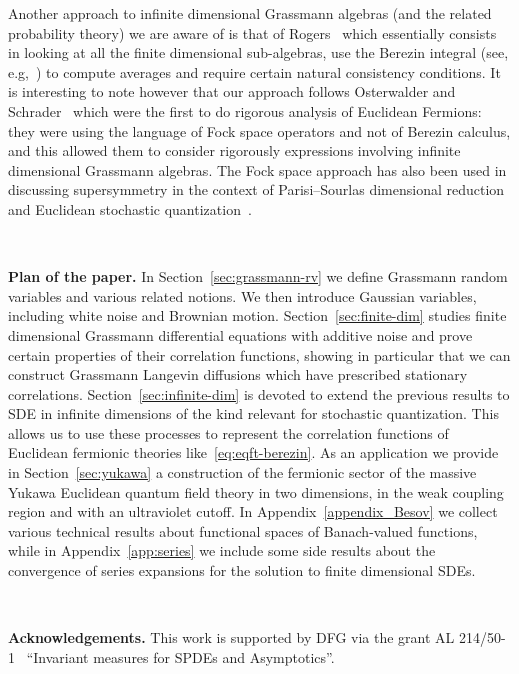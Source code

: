 \documentclass{article}
\newcommand{\tmtextbf}[1]{{\bfseries{#1}}}
\begin{document}
Another approach to infinite dimensional Grassmann algebras (and the related
probability theory) we are aware of is that of
Rogers~{\cite{rogers_graded_1986}} which essentially consists in looking at
all the finite dimensional sub-algebras, use the Berezin integral (see,
e.g,~{\cite{kirillov_introduction_1987}}) to compute averages and require
certain natural consistency conditions. It is interesting to note however that
our approach follows Osterwalder and
Schrader~{\cite{osterwalder_euclidean_1973,osterwalder_euclidean_1973-2}}
which were the first to do rigorous analysis of Euclidean Fermions: they were
using the language of Fock space operators and not of Berezin calculus, and
this allowed them to consider rigorously expressions involving infinite
dimensional Grassmann algebras. The Fock space approach has also been used in
discussing supersymmetry in the context of Parisi--Sourlas dimensional
reduction~{\cite{klein_supersymmetry_1983,klein_supersymmetry_1985}} and
Euclidean stochastic
quantization~{\cite{albeverio_elliptic_2018,albeverio_elliptic_2019,de_vecchi_note_2019}}.

\

{\noindent}\tmtextbf{Plan of the paper.} In Section~\ref{sec:grassmann-rv} we
define Grassmann random variables and various related notions. We then
introduce Gaussian variables, including white noise and Brownian motion.
Section~\ref{sec:finite-dim} studies finite dimensional Grassmann differential
equations with additive noise and prove certain properties of their
correlation functions, showing in particular that we can construct Grassmann
Langevin diffusions which have prescribed stationary correlations.
Section~\ref{sec:infinite-dim} is devoted to extend the previous results to
SDE in infinite dimensions of the kind relevant for stochastic quantization.
This allows us to use these processes to represent the correlation functions
of Euclidean fermionic theories like~{\eqref{eq:eqft-berezin}}. As an
application we provide in Section~\ref{sec:yukawa} a construction of the
fermionic sector of the massive Yukawa Euclidean quantum field theory in two
dimensions, in the weak coupling region and with an ultraviolet cutoff. In
Appendix~\ref{appendix_Besov} we collect various technical results about
functional spaces of Banach-valued functions, while in
Appendix~\ref{app:series} we include some side results about the convergence
of series expansions for the solution to finite dimensional SDEs.

\

{\noindent}\tmtextbf{Acknowledgements.} This work is supported by DFG via the
grant AL 214/50-1 \ ``Invariant measures for SPDEs and Asymptotics''.
\end{document}
